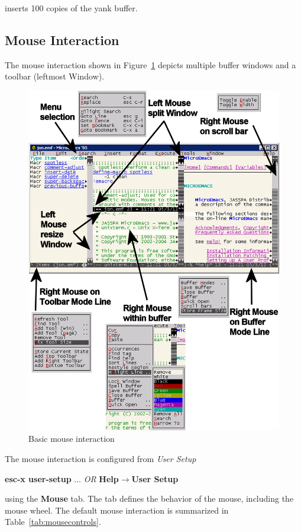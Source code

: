 \documentclass[11pt,a4paper,pdftex]{article}
\begin{document}

  inserts 100 copies of the yank buffer.

\subsection{Mouse Interaction}

  The mouse interaction shown in Figure~\ref{fig:basicmouse} depicts multiple
  buffer windows and a toolbar (leftmost Window).

  \begin{figure}[!h]
    \begin{center}
      \includegraphics[keepaspectratio,width=.75\textwidth]{basicmouse}
      \caption{Basic mouse interaction}
      \label{fig:basicmouse}
    \end{center}
  \end{figure}

  The mouse interaction is configured from \textit{User Setup}

  \textbf{esc-x user-setup} $\dots$ \textit{OR}\newline
  \textbf{Help$\rightarrow$User Setup}

  using the \textbf{Mouse} tab. The tab defines the behavior of the mouse,
  including the mouse wheel. The default mouse interaction is summarized in
  Table~\ref{tab:mousecontrols}.
\end{document}
